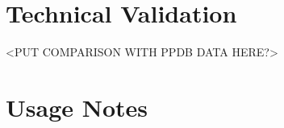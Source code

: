 \documentclass[english]{article}
\begin{document}
\section*{Technical Validation}

<PUT COMPARISON WITH PPDB DATA HERE?>

\section*{Usage Notes}
\end{document}
